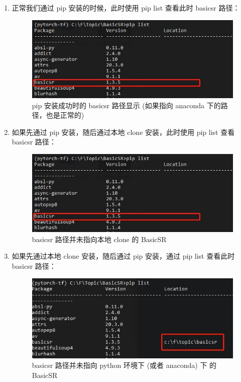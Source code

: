 \documentclass[../main.tex]{subfiles}
\begin{document}
\begin{enumerate}
\begin{enumerate}
    \item 正常我们通过 pip 安装的时候，此时使用 pip list 查看此时 basicsr 路径：
    \begin{figure}[H]
	\begin{center}
		\includegraphics[width=0.5\linewidth]{figures/installation_pip_install_location.jpg}
		\caption{pip 安装成功时的 basicsr 路径显示 (如果指向 anaconda 下的路径，也是正常的)}
		\label{fig:correct-pip-install}
	\end{center}
	\vspace{-0.5cm}
    \end{figure}

    \item 如果先通过 pip 安装，随后通过本地 clone 安装，此时使用 pip list 查看 basicsr 路径：
    \begin{figure}[H]
	\begin{center}
		\includegraphics[width=0.5\linewidth]{figures/installation_pip_install_location.jpg}
		\caption{basicsr 路径并未指向本地 clone 的 BasicSR}
		\label{fig:false-clone-install}
	\end{center}
	\vspace{-0.5cm}
    \end{figure}

    \item 如果先通过本地 clone 安装，随后通过 pip 安装，通过 pip list 查看此时 basicsr 路径：
    \begin{figure}[H]
	\begin{center}
		\includegraphics[width=0.5\linewidth]{figures/installation_clone_install_location.jpg}
		\caption{basicsr 路径并未指向 python 环境下 (或者 anaconda) 下 的 BasicSR}
		\label{fig:false-pip-install}
	\end{center}
	\vspace{-0.5cm}
    \end{figure}


\end{enumerate}
\end{enumerate}
\end{document}
